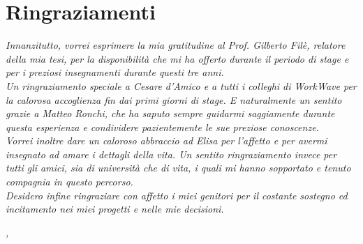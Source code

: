 \bigskip

\begingroup
\let\clearpage\relax
\let\cleardoublepage\relax
\let\cleardoublepage\relax

\chapter*{Ringraziamenti}

\noindent \textit{Innanzitutto, vorrei esprimere la mia gratitudine al Prof. Gilberto Filè, relatore della mia tesi, per la disponibilità che mi ha offerto durante il periodo di stage e per i preziosi insegnamenti durante questi tre anni.}\\

\noindent \textit{Un ringraziamento speciale a Cesare d'Amico e a tutti i colleghi di WorkWave per la calorosa accoglienza fin dai primi giorni di stage. E naturalmente un sentito grazie a Matteo Ronchi, che ha saputo sempre guidarmi saggiamente durante questa esperienza e condividere pazientemente le sue preziose conoscenze.}\\

\noindent \textit{Vorrei inoltre dare un caloroso abbraccio ad Elisa per l'affetto e per avermi insegnato ad amare i dettagli della vita. Un sentito ringraziamento invece per tutti gli amici, sia di università che di vita, i quali mi hanno sopportato e tenuto compagnia in questo percorso.}\\

\noindent \textit{Desidero infine ringraziare con affetto i miei genitori per il costante sostegno ed incitamento nei miei progetti e nelle mie decisioni.}\\

\bigskip

\noindent\textit{\myLocation, \myTime}
\hfill \myName

\endgroup

